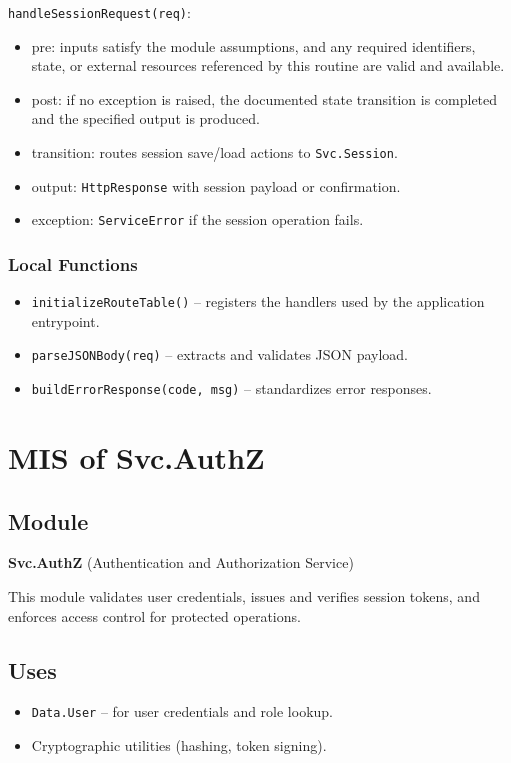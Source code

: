 \documentclass[12pt, titlepage]{article}
\begin{document}
\noindent \texttt{handleSessionRequest(req)}:
\begin{itemize}
    \item pre: inputs satisfy the module assumptions, and any required identifiers, state, or external resources referenced by this routine are valid and available.
    \item post: if no exception is raised, the documented state transition is completed and the specified output is produced.
    \item transition: routes session save/load actions to \texttt{Svc.Session}.
    \item output: \texttt{HttpResponse} with session payload or confirmation.
    \item exception: \texttt{ServiceError} if the session operation fails.
\end{itemize}

\subsubsection{Local Functions}
\begin{itemize}
    \item \texttt{initializeRouteTable()} – registers the handlers used by the application entrypoint.
    \item \texttt{parseJSONBody(req)} – extracts and validates JSON payload.
    \item \texttt{buildErrorResponse(code, msg)} – standardizes error responses.
\end{itemize}

\section{MIS of Svc.AuthZ} \label{Svc.AuthZ}

\subsection{Module}
\textbf{Svc.AuthZ} \; (Authentication and Authorization Service)

This module validates user credentials, issues and verifies session tokens, and enforces access control for protected operations.

\subsection{Uses}
\begin{itemize}
    \item \texttt{Data.User} – for user credentials and role lookup.
    \item Cryptographic utilities (hashing, token signing).
\end{itemize}
\end{document}
